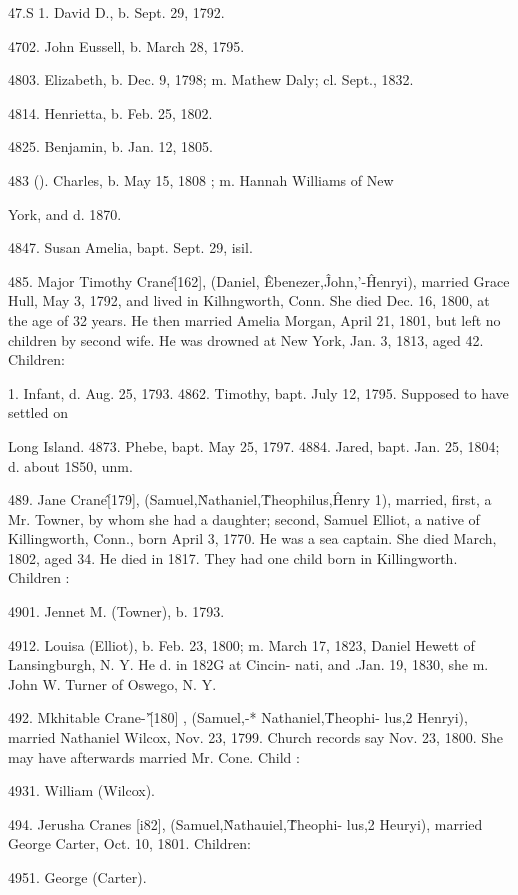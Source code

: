 \documentclass{book}
\begin{document}
47.S 1. David D., b. Sept. 29, 1792. 

4702. John Eussell, b. March 28, 1795. 

4803. Elizabeth, b. Dec. 9, 1798; m. Mathew Daly; cl. Sept., 1832. 

4814. Henrietta, b. Feb. 25, 1802. 

4825. Benjamin, b. Jan. 12, 1805. 

483 (). Charles, b. May 15, 1808 ; m. Hannah Williams of New 

York, and d. 1870. 

4847. Susan Amelia, bapt. Sept. 29, isil. 

485. Major Timothy Crane\^ [162], (Daniel, \^ Ebenezer,\^ 
John,'-\^ Henryi), married Grace Hull, May 3, 1792, and lived in 
Kilhngworth, Conn. She died Dec. 16, 1800, at the age of 32 
years. He then married Amelia Morgan, April 21, 1801, but 
left no children by second wife. He was drowned at New York, 
Jan. 3, 1813, aged 42. Children: 

1. Infant, d. Aug. 25, 1793. 
4862. Timothy, bapt. July 12, 1795. Supposed to have settled on 

Long Island. 
4873. Phebe, bapt. May 25, 1797. 
4884. Jared, bapt. Jan. 25, 1804; d. about 1S50, unm. 

489. Jane Crane\^ [179], (Samuel,\^ Nathaniel,\^ Theophilus,\^ 
Henry 1), married, first, a Mr. Towner, by whom she had a 
daughter; second, Samuel Elliot, a native of Killingworth, Conn., 
born April 3, 1770. He was a sea captain. She died March, 
1802, aged 34. He died in 1817. They had one child born in 
Killingworth. Children : 

4901. Jennet M. (Towner), b. 1793. 

4912. Louisa (Elliot), b. Feb. 23, 1800; m. March 17, 1823, Daniel 
Hewett of Lansingburgh, N. Y. He d. in 182G at Cincin- 
nati, and .Jan. 19, 1830, she m. John W. Turner of Oswego, 
N. Y. 

492. Mkhitable Crane-'\^ [180] , (Samuel,-* Nathaniel,\^ Theophi- 
lus,2 Henryi), married Nathaniel Wilcox, Nov. 23, 1799. Church 
records say Nov. 23, 1800. She may have afterwards married 
Mr. Cone. Child : 

4931. William (Wilcox). 




494. Jerusha Cranes [i82], (Samuel,\^ Nathauiel,\^ Theophi- 
lus,2 Heuryi), married George Carter, Oct. 10, 1801. Children: 

4951. George (Carter). 
\end{document}
